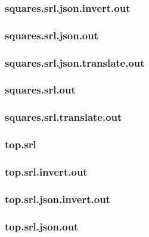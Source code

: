 \subsubsection{squares.srl.json.invert.out}
\label{app:squares_srl.json.invert.out}

\subsubsection{squares.srl.json.out}
\label{app:squares_srl.json.out}

\subsubsection{squares.srl.json.translate.out}
\label{app:squares_srl.json.translate.out}

\subsubsection{squares.srl.out}
\label{app:squares_srl.out}

\subsubsection{squares.srl.translate.out}
\label{app:squares_srl.translate.out}

\subsubsection{top.srl}
\label{app:top_srl}

\subsubsection{top.srl.invert.out}
\label{app:top_srl.invert.out}

\subsubsection{top.srl.json.invert.out}
\label{app:top_srl.json.invert.out}

\subsubsection{top.srl.json.out}
\label{app:top_srl.json.out}

